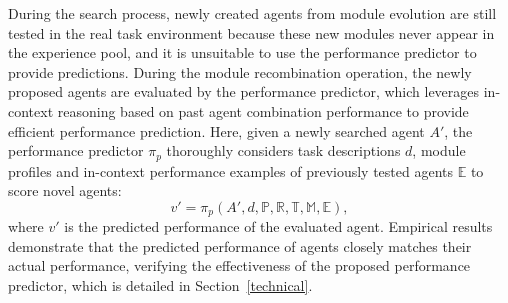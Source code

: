 During the search process, newly created agents from module evolution are still tested in the real task environment because these new modules never appear in the experience pool, and it is unsuitable to use the performance predictor to provide predictions.
During the module recombination operation, the newly proposed agents are evaluated by the performance predictor, which leverages in-context reasoning based on past agent combination performance to provide efficient performance prediction.  
Here, given a newly searched agent $A'$, the performance predictor $\pi_p$ thoroughly considers task descriptions $d$, module profiles and in-context performance examples of previously tested agents $\mathbb{E}$ to score novel agents:
\begin{equation}
    v' = \pi_p(A', d, \mathbb{P}, \mathbb{R}, \mathbb{T}, \mathbb{M}, \mathbb{E}),
\end{equation}
where $v'$ is the predicted performance of the evaluated agent.
Empirical results demonstrate that the predicted performance of agents closely matches their actual performance, verifying the effectiveness of the proposed performance predictor, which is detailed in Section~\ref{technical}.


